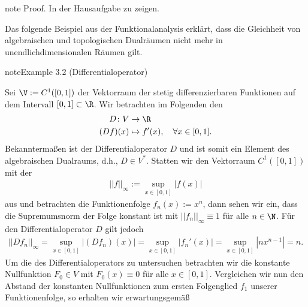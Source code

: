 \documentclass[letterpaper,10pt,english]{jupyterBook}
\begin{document}
\begin{sphinxadmonition}{note}
\sphinxAtStartPar
Proof. In der Hausaufgabe zu zeigen.
\end{sphinxadmonition}

\sphinxAtStartPar
Das folgende Beispiel aus der Funktionalanalysis erklärt, dass die Gleichheit von algebraischen und topologischen Dualräumen nicht mehr in unendlich\sphinxhyphen{}dimensionalen Räumen gilt.
\label{vektoranalysis/multilinear:example-5}
\begin{sphinxadmonition}{note}{Example 3.2 (Differentialoperator)}



\sphinxAtStartPar
Sei \(\V := C^1([0,1])\) der Vektorraum der stetig differenzierbaren Funktionen auf dem Intervall \([0,1] \subset \R\).
Wir betrachten im Folgenden den 
\begin{equation*}
\begin{split}D \colon V &\rightarrow \R \\
(Df)(x) &\mapsto f'(x), \quad \forall x \in [0,1].\end{split}
\end{equation*}
\sphinxAtStartPar
Bekanntermaßen ist der Differentialoperator \(D\)  und ist somit ein Element des algebraischen Dualraums, d.h., \(D \in V^\ast\).
Statten wir den Vektorraum \(C^1([0,1])\) mit der 
\begin{equation*}
\begin{split}||f||_\infty := \sup_{x \in [0,1]} |f(x)|\end{split}
\end{equation*}
\sphinxAtStartPar
aus und betrachten die Funktionenfolge \(f_n(x) := x^n\), dann sehen wir ein, dass die Supremumsnorm der Folge konstant ist mit \(||f_n||_\infty \equiv 1\) für alle \(n\in\N\).
Für den Differentialoperator \(D\) gilt jedoch
\begin{equation*}
\begin{split}||Df_n||_\infty = \sup_{x \in [0,1]} |(Df_n)(x)| = \sup_{x \in [0,1]} |f_n'(x)| = \sup_{x \in [0,1]} |nx^{n-1}| = n.\end{split}
\end{equation*}
\sphinxAtStartPar
Um die  des Differentialoperators zu untersuchen betrachten wir die konstante Nullfunktion \(F_0 \in V\) mit \(F_0(x) \equiv 0\) für alle \(x \in [0,1]\).
Vergleichen wir nun den Abstand der konstanten Nullfunktionen zum ersten Folgenglied \(f_1\) unserer Funktionenfolge, so erhalten wir erwartungsgemäß

\end{sphinxadmonition}
\end{document}
